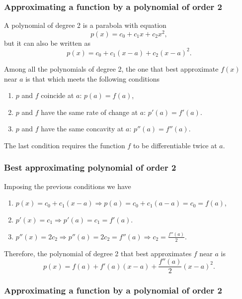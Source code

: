 \begin{frame}
	\frametitle{Approximating a function by a polynomial of order 2}
	A polynomial of degree 2 is a parabola with equation
	\[
		p(x) = c_0+c_1x+c_2x^2,
	\]
	but it can also be written as
	\[
		p(x) = c_0+c_1(x-a)+c_2(x-a)^2.
	\]
	
	Among all the polynomials of degree 2, the one that best approximate $f(x)$ near $a$ is that which meets the following conditions
	\begin{enumerate}
		\item $p$ and $f$ coincide at $a$: $p(a) = f(a)$,
		\item $p$ and $f$ have the same rate of change at $a$: $p'(a) = f'(a)$.
		\item $p$ and $f$ have the same concavity at $a$: $p''(a)=f''(a)$.
	\end{enumerate}
	The last condition requires the function $f$ to be differentiable twice at $a$.
\end{frame}


\begin{frame}
	\frametitle{Best approximating polynomial of order 2}
	Imposing the previous conditions we have
	\begin{enumerate}
		\item $p(x)=c_0+c_1(x-a) \Rightarrow p(a)=c_0+c_1(a-a)=c_0=f(a)$,
		\item $p'(x)=c_1 \Rightarrow p'(a)=c_1=f'(a)$.
		\item $p''(x)=2c_2 \Rightarrow p''(a)=2c_2=f''(a) \Rightarrow c_2=\frac{f''(a)}{2}$.
	\end{enumerate}
	
	Therefore, the polynomial of degree 2 that best approximates $f$ near $a$ is
	\[
		p(x) = f(a)+f'(a)(x-a)+\frac{f''(a)}{2}(x-a)^2.
	\]
\end{frame}


\begin{frame}
	\frametitle{Approximating a function by a polynomial of order 2}
	\begin{center}
		
	\end{center}
\end{frame}


